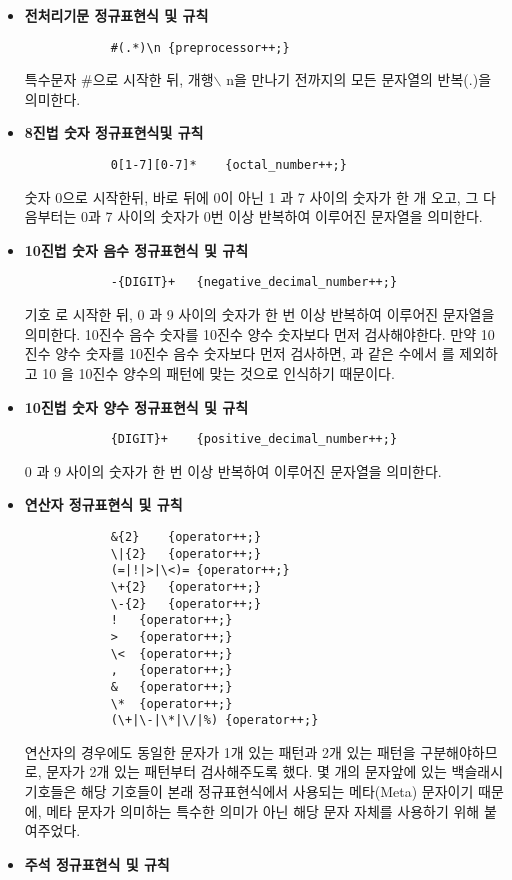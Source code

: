 \documentclass{article}
\begin{document}
\begin{itemize}
		\begin{itemize}
			\item {\bf 전처리기문 정규표현식 및 규칙}
			\begin{lstlisting}
			#(.*)\n	{preprocessor++;}
			\end{lstlisting}
			특수문자 \#으로 시작한 뒤, 개행$\backslash$ n을 만나기 전까지의 모든 문자열의 반복(.\*)을 의미한다.
			\item {\bf 8진법 숫자 정규표현식및 규칙}
			\begin{lstlisting}
			0[1-7][0-7]*	{octal_number++;}
			\end{lstlisting}
			숫자 0으로 시작한뒤, 바로 뒤에 0이 아닌 1 과 7 사이의 숫자가 한 개 오고, 그 다음부터는 0과 7
			사이의 숫자가 0번 이상 반복하여 이루어진 문자열을 의미한다.
			\item {\bf 10진법 숫자 음수 정규표현식 및 규칙}
			\begin{lstlisting}
			-{DIGIT}+	{negative_decimal_number++;}
			\end{lstlisting}
			기호 \-로 시작한 뒤, 0 과 9 사이의 숫자가 한 번 이상 반복하여 이루어진 문자열을 의미한다.
			10진수 음수 숫자를 10진수 양수 숫자보다 먼저 검사해야한다. 만약 10진수 양수 숫자를 10진수
			음수 숫자보다 먼저 검사하면,  과 같은 수에서 \- 를 제외하고 10 을 10진수 양수의 패턴에
			맞는 것으로 인식하기 때문이다.
			\item {\bf 10진법 숫자 양수 정규표현식 및 규칙}
			\begin{lstlisting}
			{DIGIT}+	{positive_decimal_number++;}
			\end{lstlisting}
			0 과 9 사이의 숫자가 한 번 이상 반복하여 이루어진 문자열을 의미한다.
			\item {\bf 연산자 정규표현식 및 규칙}
			\begin{lstlisting}
			&{2}	{operator++;}
			\|{2}	{operator++;}
			(=|!|>|\<)=	{operator++;}
			\+{2}	{operator++;}
			\-{2}	{operator++;}
			!	{operator++;}
			>	{operator++;}
			\<	{operator++;}
			,	{operator++;}
			&	{operator++;}
			\*	{operator++;}
			(\+|\-|\*|\/|%)	{operator++;}
			\end{lstlisting}
			연산자의 경우에도 동일한 문자가 1개 있는 패턴과 2개 있는 패턴을
			구분해야하므로, 문자가 2개 있는 패턴부터 검사해주도록 했다.
			몇 개의 문자앞에 있는 백슬래시 기호들은 해당 기호들이 본래 정규표현식에서
			사용되는 메타(Meta) 문자이기 때문에, 메타 문자가 의미하는 특수한 의미가
			아닌 해당 문자 자체를 사용하기 위해 붙여주었다.
			\item {\bf 주석 정규표현식 및 규칙}
			\begin{lstlisting}

\end{lstlisting}
\end{itemize}
\end{itemize}
\end{document}
